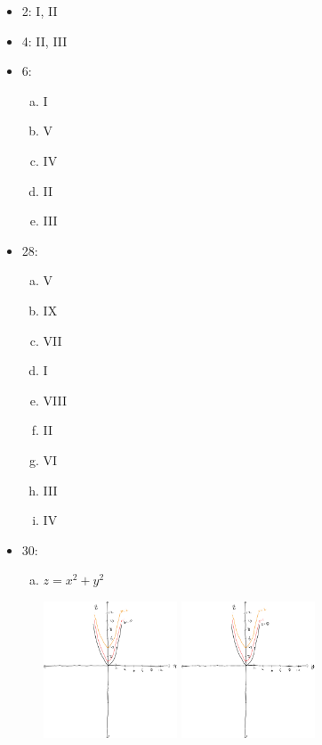 \documentclass[9pt]{extarticle}
\begin{document}
  \begin{problem}{12.2}
    \begin{itemize}
      \item 2: I, II
      \item 4: II, III
      \item 6:
        \begin{enumerate}[(a)]
          \item I
          \item V
          \item IV
          \item II
          \item III
        \end{enumerate}
      \item 28:
        \begin{enumerate}[(a)]
          \item V
          \item IX
          \item VII
          \item I
          \item VIII
          \item II
          \item VI
          \item III
          \item IV
        \end{enumerate}
      \item 30:
        \begin{enumerate}[(a)]
          \item $z = x^2 + y^2$
            \begin{center}
              \includegraphics[width=0.33\textwidth]{12_2_30_a_1}
              \includegraphics[width=0.33\textwidth]{12_2_30_a_2}

\end{center}
\end{enumerate}
\end{itemize}
\end{problem}
\end{document}
